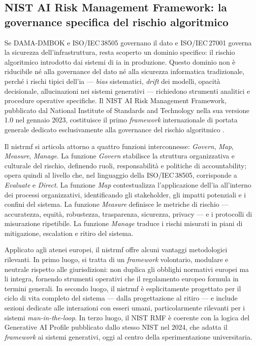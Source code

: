 \subsection{NIST AI Risk Management Framework: la governance specifica del rischio
algoritmico}
\label{subsec:nist-airmf}

Se DAMA-DMBOK e ISO/IEC\,38505 governano il dato e ISO/IEC\,27001 governa la sicurezza
dell'infrastruttura, resta scoperto un dominio specifico: il rischio algoritmico
introdotto dai sistemi di \gls{ia} in produzione. Questo dominio non è riducibile né alla
governance del dato né alla sicurezza informatica tradizionale, perché i rischi tipici
dell'\gls{ia} --- \textit{bias} sistematici, \textit{drift} dei modelli, opacità decisionale,
allucinazioni nei sistemi generativi --- richiedono strumenti analitici e procedure
operative specifiche. Il NIST AI Risk Management Framework, pubblicato dal National
Institute of Standards and Technology nella sua versione 1.0 nel gennaio 2023, costituisce
il primo \textit{framework} internazionale di portata generale dedicato esclusivamente
alla governance del rischio algoritmico \parencite{NIST_AI_RMF}.

Il \gls{nistrmf} si articola attorno a quattro funzioni interconnesse: \textit{Govern},
\textit{Map}, \textit{Measure}, \textit{Manage}. La funzione \textit{Govern} stabilisce
la struttura organizzativa e culturale del rischio, definendo ruoli, responsabilità e
politiche di accountability; opera quindi al livello che, nel linguaggio della
ISO/IEC\,38505, corrisponde a \textit{Evaluate} e \textit{Direct}. La funzione
\textit{Map} contestualizza l'applicazione dell'\gls{ia} all'interno dei processi
organizzativi, identificando gli stakeholder, gli impatti potenziali e i confini del
sistema. La funzione \textit{Measure} definisce le metriche di rischio --- accuratezza,
equità, robustezza, trasparenza, sicurezza, privacy --- e i protocolli di misurazione
ripetibile. La funzione \textit{Manage} traduce i rischi misurati in piani di mitigazione,
escalation e ritiro del sistema.

Applicato agli atenei europei, il \gls{nistrmf} offre alcuni vantaggi metodologici rilevanti.
In primo luogo, si tratta di un \textit{framework} volontario, modulare e
neutrale rispetto alle giurisdizioni: non duplica gli obblighi normativi europei ma li
integra, fornendo strumenti operativi che il regolamento europeo formula in termini
generali. In secondo luogo, il \gls{nistrmf} è esplicitamente progettato per il
ciclo di vita completo del sistema --- dalla progettazione al ritiro --- e
include sezioni dedicate alle interazioni con esseri umani, particolarmente rilevanti per
i sistemi \textit{man-in-the-loop}. In terzo luogo, il NIST RMF è coerente con la logica
del Generative AI Profile pubblicato dallo stesso NIST nel 2024, che adatta il
\textit{framework} ai sistemi generativi, oggi al centro della sperimentazione
universitaria.

